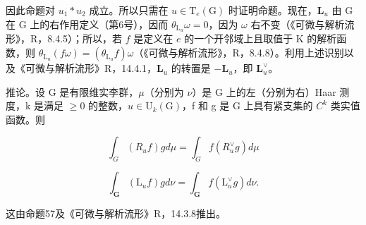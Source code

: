 因此命题对 \(u_{1} * u_{2}\) 成立。所以只需在 \(u \in \mathrm{T}_{e}(\mathrm{G})\) 时证明命题。现在，\(\mathbf{L}_u\) 由 G 在 G 上的右作用定义（第6号），因而 \(\theta_{\mathrm{L}_u}\omega = 0\)，因为 \(\omega\) 右不变（《可微与解析流形》，R，8.4.5）；所以，若 \(f\) 是定义在 \(e\) 的一个开邻域上且取值于 K 的解析函数，则 \(\theta_{\mathrm{L}_u}(f\omega) = (\theta_{\mathrm{L}_u}f)\omega\)（《可微与解析流形》，R，8.4.8）。利用上述识别以及《可微与解析流形》R，14.4.1，\(\mathbf{L}_u\) 的转置是 \(-\mathbf{L}_u\)，即 \(\mathbf{L}_u^\vee\)。

推论。设 G 是有限维实李群，\(\mu\)（分别为 \(\nu\)）是 G 上的左（分别为右）Haar 测度，k 是满足 \(\geqslant0\) 的整数，\(u\in\mathrm{U}_{k}(\mathrm{G})\)，f 和 g 是 G 上具有紧支集的 \(C^{k}\) 类实值函数。则

\[
\int_ {G} \left(R _ {u} f\right) g d \mu = \int_ {G} f (R _ {u} ^ {\vee} g) d \mu
\]

\[
\int_ {\mathbf {G}} \left(\mathrm{L} _ {u} f\right) g d \nu = \int_ {\mathbf {G}} f (\mathrm{L} _ {u} ^ {\vee} g) d \nu .
\]

这由命题57及《可微与解析流形》R，14.3.8推出。

